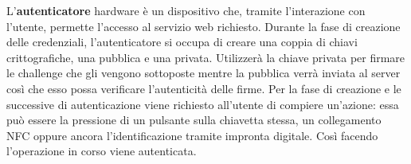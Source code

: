 

L'\textbf{autenticatore} hardware è un dispositivo che, tramite l'interazione con l'utente, permette l'accesso al servizio web richiesto. Durante la fase di creazione delle credenziali, l'autenticatore si occupa di creare una coppia di chiavi crittografiche, una pubblica e una privata. Utilizzerà la chiave privata per firmare le challenge che gli vengono sottoposte mentre la pubblica verrà inviata al server così che esso possa verificare l'autenticità delle firme.
Per la fase di creazione e le successive di autenticazione viene richiesto all'utente di compiere un'azione: essa può essere la pressione di un pulsante sulla chiavetta stessa, un collegamento NFC oppure ancora l'identificazione tramite impronta digitale. Così facendo l'operazione in corso viene autenticata.



